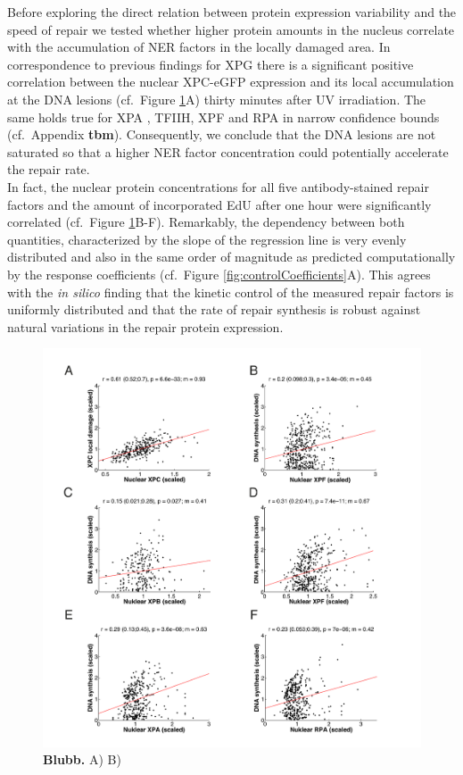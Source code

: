 Before exploring the direct relation between protein expression variability and the speed of repair we tested whether higher protein amounts in the nucleus correlate with the accumulation of NER factors in the locally damaged area. In correspondence to previous findings for XPG \cite{Luijsterburg2010} there is a significant positive correlation between the nuclear XPC-eGFP expression and its local accumulation at the DNA lesions (cf.\ Figure \ref{fig:Nuc_vs_DNAsynthesis}A) thirty minutes after UV irradiation. The same holds true for XPA \cite{Verbruggen2014}, TFIIH, XPF and RPA in narrow confidence bounds (cf.\ Appendix \textbf{tbm}). Consequently, we conclude that the DNA lesions are not saturated so that a higher NER factor concentration could potentially accelerate the repair rate.\\
In fact, the nuclear protein concentrations for all five antibody-stained repair factors and the amount of incorporated EdU after one hour were significantly correlated (cf.\ Figure \ref{fig:Nuc_vs_DNAsynthesis}B-F). Remarkably, the dependency between both quantities, characterized by the slope of the regression line is very evenly distributed and also in the same order of magnitude as predicted computationally by the response coefficients (cf.\ Figure \ref{fig:controlCoefficients}A). This agrees with the \textit{in silico} finding that the kinetic control of the measured repair factors is uniformly distributed and that the rate of repair synthesis is robust against natural variations in the repair protein expression.    
       
\begin{figure}[htbp]
	\begin{center}
		\includegraphics[width=1\textwidth]{Abbildungen/figure3_3.pdf}
		\caption{\textbf{Blubb.} A) B) }
		\label{fig:Nuc_vs_DNAsynthesis}
	\end{center}
\end{figure}

